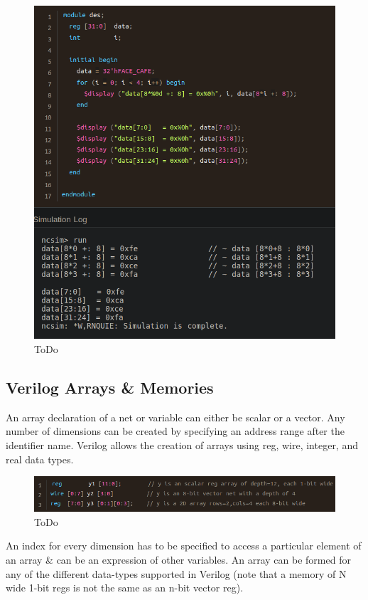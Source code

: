 \documentclass{article}
\begin{document}
	\begin{figure}[H]
		\includegraphics[width=\linewidth]{VerilogPics/figure_18.png}
		\caption{ToDo}
		\label{ToDo}
	\end{figure}

	\subsection{Verilog Arrays \& Memories}

	An array declaration of a net or variable can either be scalar or a vector. Any number of dimensions can be created by specifying an address range after the identifier name. Verilog allows the
	creation of arrays using reg, wire, integer, and real data types.

	\begin{figure}[H]
		\includegraphics[width=\linewidth]{VerilogPics/figure_19.png}
		\caption{ToDo}
		\label{ToDo}
	\end{figure}

	An index for every dimension has to be specified to access a particular element of an array \& can be an expression of other variables. An array can be formed for any of the different data-types 
	supported in Verilog (note that a memory of N wide 1-bit regs is not the same as an n-bit vector reg). \newline \newline
\end{document}
